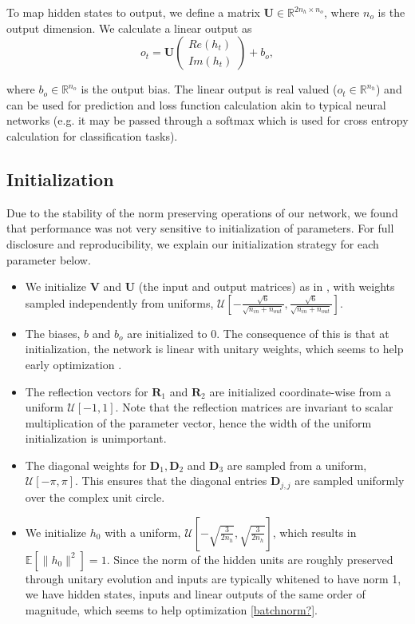 \documentclass{article} %
\newcommand{\matr}[1]{\mathbf{#1}}
\newcommand\RR{\mathbb{R}}
\begin{document}
To map hidden states to output, we define a matrix $\matr{U} \in \RR^{2n_h \times n_o}$, 
where $n_o$ is the output dimension. We calculate a linear output as
\begin{equation} o_t = \matr{U} \begin{pmatrix} Re(h_t) \\ Im(h_t) \end{pmatrix} + b_o , \end{equation}

where $b_o \in \RR^{n_o}$ is the output bias. 
The linear output is real valued ($o_t \in \RR^{n_h}$) and can be used for prediction and loss function 
calculation akin to typical neural networks (e.g. it may be passed through a softmax which is used for 
cross entropy calculation for classification tasks).


\subsection{Initialization}

Due to the stability of the norm preserving operations of our network, we found that performance was
not very sensitive to initialization of parameters.
For full disclosure and reproducibility, we explain our initialization strategy for each parameter below.

\begin{itemize}
  \item We initialize $\matr{V}$ and $\matr{U}$ (the input and output matrices) as in \cite{Glorotinit},
  with weights sampled independently from uniforms, $\mathcal{U}\left[-\frac{\sqrt{6}}{\sqrt{n_{in}+ n_{out}}}, \frac{\sqrt{6}}{\sqrt{n_{in}+ n_{out}}}\right]$.
  \item The biases, $b$ and $b_o$ are initialized to 0. The consequence of this is that at initialization, 
    the network is linear with unitary weights, which seems to help early optimization \citep{Saxe2014}.
  \item The reflection vectors for $\matr{R}_1$ and $\matr{R}_2$ are initialized coordinate-wise from a 
  uniform $\mathcal{U}[-1, 1]$. Note that the reflection matrices are invariant to scalar multiplication 
  of the parameter vector, hence the width of the uniform initialization is unimportant.
  \item The diagonal weights for $\matr{D}_1, \matr{D}_2$ and $\matr{D}_3$ are sampled 
  from a uniform, $\mathcal{U}[-\pi, \pi]$. This ensures that the diagonal entries $\matr{D}_{j,j}$
  are sampled uniformly over the complex unit circle.
  \item We initialize $h_0$ with a uniform, 
  $\mathcal{U}\left[-\sqrt{\frac{3}{2n_h}}, \sqrt{\frac{3}{2n_h}} \right]$, 
  which results in $\mathbb{E}\left[\|h_0\|^2\right] = 1$. Since the norm of the hidden units are roughly 
  preserved through unitary evolution and inputs are typically whitened to have norm 1, 
  we have hidden states, inputs and linear outputs of the same order of magnitude, which seems to
  help optimization \ref{batchnorm?}.
\end{itemize}
\end{document}

